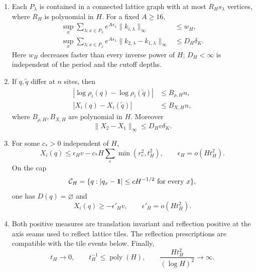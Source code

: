\begin{enumerate}
\item[\textup{(C1)}]
Each \(P_\lambda\) is contained in a connected lattice graph with at
most \(R_Hs_\lambda\) vertices, where \(R_H\) is polynomial in \(H\).
For a fixed \(A\ge16\),
\begin{align}
 \sup_x\sum_{\lambda:x\in P_\lambda}
          e^{As_\lambda}\|k_{i,\lambda}\|_\infty
       &\le w_H, \label{cmp:activity}\\
 \sup_x\sum_{\lambda:x\in P_\lambda}
          e^{As_\lambda}
          \|k_{2,\lambda}-k_{1,\lambda}\|_\infty
       &\le D_H\delta_K. \label{cmp:activity-difference}
\end{align}
Here \(w_H\) decreases faster than every inverse power of \(H\);
\(D_H<\infty\) is independent of the period and the cutoff depths.

\item[\textup{(C2)}]
If \(q,\widetilde q\) differ at \(n\) sites, then
\begin{align}
 |\log\rho_i(q)-\log\rho_i(\widetilde q)|
       &\le B_{\rho,H}n, \label{cmp:density-finite-energy}\\
 |X_i(q)-X_i(\widetilde q)|
       &\le B_{X,H}n, \label{cmp:exponent-finite-energy}
\end{align}
where \(B_{\rho,H},B_{X,H}\) are polynomial in \(H\).  Moreover
\begin{equation}
 \|X_2-X_1\|_\infty\le D_Hv\delta_K.
 \label{cmp:exponent-difference}
\end{equation}

\item[\textup{(C3)}]
For some \(c_*>0\) independent of \(H\),
\begin{equation}
 X_i(q)\le \epsilon_Hv-
                c_*H\sum_e\min(r_e^2,t_H^2),
 \qquad \epsilon_H=o(Ht_H^2).
 \label{cmp:stability}
\end{equation}
On the cap
\[
 {\cal C}_H=\{q:|q_x-\mathbf1|\le cH^{-1/2}
                         \text{ for every }x\},
\]
one has \(D(q)=\varnothing\) and
\begin{equation}
 X_i(q)\ge-\epsilon'_Hv,\qquad
 \epsilon'_H=o(Ht_H^2).
 \label{cmp:cap}
\end{equation}

\item[\textup{(C4)}]
Both positive measures are translation invariant and reflection
positive at the axis seams used to reflect lattice tiles.  The
reflection prescriptions are compatible with the tile events below.
Finally,
\[
 t_H\longrightarrow0,\qquad
 t_H^{-1}\le\operatorname{poly}(H),\qquad
 \frac{Ht_H^2}{(\log H)^2}\longrightarrow\infty .
 \label{cmp:thresholds}
\]
\end{enumerate}

